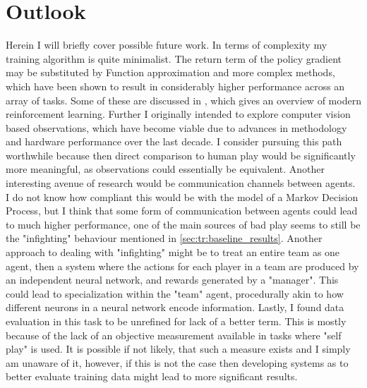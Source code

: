 \section{Outlook}
Herein I will briefly cover possible future work. In terms of complexity my training algorithm is quite minimalist. The return term of the policy gradient may be substituted by Function approximation and more complex methods, which have been shown to result in considerably higher performance across an array of tasks. Some of these are discussed in \cite{arulkumaran_brief_2017}, which gives an overview of modern reinforcement learning. Further I originally intended to explore computer vision based observations, which have become viable due to advances in methodology and hardware performance over the last decade. I consider pursuing this path worthwhile because then direct comparison to human play would be significantly more meaningful, as observations could essentially be equivalent. Another interesting avenue of research would be communication channels between agents. I do not know how compliant this would be with the model of a Markov Decision Process, but I think that some form of communication between agents could lead to much higher performance, one of the main sources of bad play seems to still be the "infighting" behaviour mentioned in \ref{sec:tr:baseline_results}. Another approach to dealing with "infighting" might be to treat an entire team as one agent, then a system where the actions for each player in a team are produced by an independent neural network, and rewards generated by a "manager". This could lead to specialization within the "team" agent, procedurally akin to how different neurons in a neural network encode information.
Lastly, I found data evaluation in this task to be unrefined for lack of a better term. This is mostly because of the lack of an objective measurement available in tasks where "self play" is used. It is possible if not likely, that such a measure exists and I simply am unaware of it, however, if this is not the case then developing systems as to better evaluate training data might lead to more significant results.